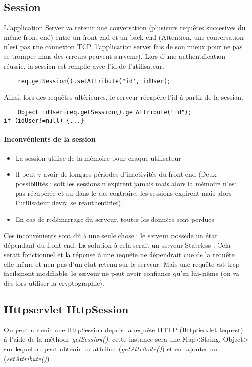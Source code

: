 \documentclass{article}[12pt]
\begin{document}
\subsection{Session}
L'application Server va retenir une conversation (plusieurs requêtes succesives du même front-end) entre un front-end et un back-end (Attention, une conversation n'est pas une connexion TCP, l'application server fais de son mieux pour ne pas se tromper mais des erreurs peuvent survenir).
\newline
\newline
Lors d'une authentification réussie, la session est remplie avec l'id de l'utilisateur.
\begin{lstlisting}
	req.getSession().setAttribute("id", idUser);
\end{lstlisting}
Ainsi, lors des requêtes ultérieures, le serveur récupère l'id à partir de la session.
\begin{lstlisting}
	Object idUser=req.getSession().getAttribute("id");
if (idUser!=null) {...}
\end{lstlisting}
\paragraph{Inconvénients de la session}
\begin{itemize}
	\item La session utilise de la 	mémoire pour chaque utilisateur
    \item Il peut y avoir de longues périodes d'inactivités du front-end (Deux possibilités : soit les sessions n'expirent jamais mais alors la mémoire n'est pas récupérée et au dans le cas contraire, les sessions expirent mais alors l'utilisateur devra se réauthentifier).
    \item En cas de redémarrage du serveur, toutes les données sont perdues
\end{itemize}
Ces inconvénients sont dû à une seule chose : le serveur possède un état dépendant du front-end.
\newline
\newline
La solution à cela serait un serveur Stateless : Cela serait fonctionnel et la réponse à une requête ne dépendrait que de la requête elle-même et non pas d'un état retenu sur le serveur.
\newline
\newline
Mais une requête est trop facilement modifiable, le serveur ne peut avoir confiance qu'en lui-même (on va dès lors utiliser la cryptographie). 
\subsection{Httpservlet HttpSession}
On peut obtenir une HttpSession depuis la requête HTTP (HttpServletRequest) à l'aide de la méthode \emph{getSession()}, cette instance sera une Map<String, Object> sur lequel on peut obtenir un attribut (\emph{getAttribute()}) et en rajouter un (\emph{setAttribute()})
\end{document}

